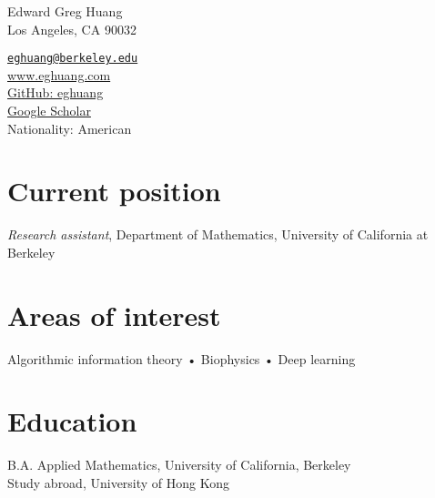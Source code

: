 \documentclass[10pt, letterpaper]{article}
\newcommand{\years}[1]{\marginnote{\scriptsize #1}}
\begin{document}
{\LARGE Edward Greg Huang}\\[1cm]
Los Angeles, CA 90032


\href{mailto:eghuang@berkeley.edu}{\lstinline{eghuang@berkeley.edu}}\\
\href{https://www.eghuang.com}{www.eghuang.com}\\
\href{https://github.com/eghuang}{GitHub: eghuang}\\
\href{https://scholar.google.com/citations?user=DlUurWMAAAAJ}{Google Scholar}\\

Nationality: American

\section*{Current position}
\emph{Research assistant}, Department of Mathematics, University of California at Berkeley

\section*{Areas of interest}
Algorithmic information theory • Biophysics • Deep learning  

\section*{Education}
\noindent

\years{2019}\textsc{B.A.} Applied Mathematics, University of California, Berkeley\\
\years{2016}Study abroad, University of Hong Kong

\end{document}
